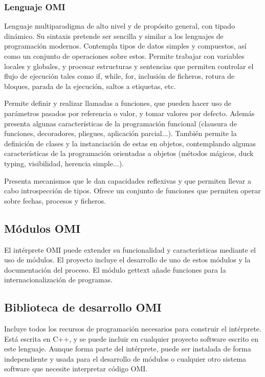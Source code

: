 \subsubsection{Lenguaje OMI}
Lenguaje multiparadigma de alto nivel y de propósito general, con tipado dinámico. Su sintaxis pretende ser sencilla y similar a los lenguajes de programación modernos. 
Contempla tipos de datos simples y compuestos, así como un conjunto de operaciones sobre estos. Permite trabajar con variables locales y globales, y procesar estructuras 
y sentencias que permiten controlar el flujo de ejecución tales como if, while, for, inclusión de ficheros, rotura de bloques, parada de la ejecución, saltos a etiquetas, etc.

Permite definir y realizar llamadas a funciones, que pueden hacer uso de parámetros pasados por referencia o valor, y tomar valores por defecto. Además presenta algunas 
características de la programación funcional (clausura de funciones, decoradores, pliegues, aplicación parcial...). 
También permite la definición de clases y la instanciación de estas en objetos, contemplando algunas características de la 
programación orientadas a objetos (métodos mágicos, duck typing, visibilidad, herencia simple...). 

Presenta mecanismos que le dan capacidades reflexivas y que permiten llevar a cabo introspección de tipos. 
Ofrece un conjunto de funciones que permiten operar sobre fechas, procesos y ficheros. 

\subsection{Módulos OMI}
El intérprete OMI puede extender su funcionalidad y características mediante el uso de módulos. El proyecto incluye 
el desarrollo de uno de estos módulos y la documentación del proceso. El módulo gettext añade funciones para la internacionalización de programas.

\subsection{Biblioteca de desarrollo OMI}
Incluye todos los recursos de programación necesarios para construir el intérprete. Está escrita en C++, y se puede incluir en cualquier proyecto software escrito 
en este lenguaje. Aunque forma parte del intérprete, puede ser instalada de forma independiente y usada para el desarrollo de módulos o cualquier otro sistema software 
que necesite interpretar código OMI. 

